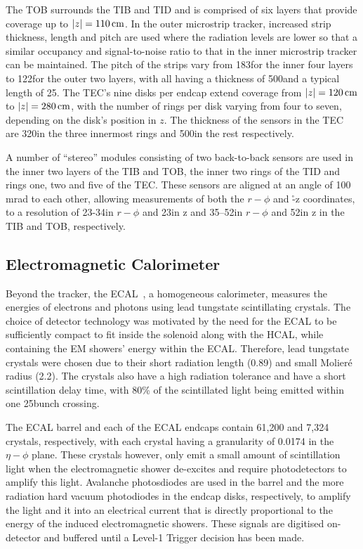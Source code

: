 The TOB surrounds the TIB and TID and is comprised of six layers that provide coverage up to $|z| = 110\,\text{cm}$.
In the outer microstrip tracker, increased strip thickness, length and pitch are used where the radiation levels are lower so that a similar occupancy and signal-to-noise ratio to that in the inner microstrip tracker can be maintained.
The pitch of the strips vary from 183\mum for the inner four layers to 122\mum for the outer two layers, with all having a thickness of 500\mum and a typical length of 25\cm. 
The TEC's nine disks per endcap extend coverage from $|z| = 120\,\text{cm}$ to $|z| = 280\,\text{cm}$, with the number of rings per disk varying from four to seven, depending on the disk's position in $z$.
The thickness of the sensors in the TEC are 320\mum in the three innermost rings and 500\mum in the rest respectively.

A number of ``stereo'' modules consisting of two back-to-back sensors are used in the inner two layers of the TIB and TOB, the inner two rings of the TID and rings one, two and five of the TEC.
These sensors are aligned at an angle of 100 mrad to each other, allowing measurements of both the $r-\phi$ and \r-z coordinates, to a resolution of 23-34\mum in $r-\phi$ and 23\mum in z and 35–52\mum in $r-\phi$ and 52\mum in z in the TIB and TOB, respectively.

\subsection{Electromagnetic Calorimeter}\label{subsec:ECAL}
Beyond the tracker, the ECAL~\cite{CMS:1997ysd,CMS:2002xia}, a homogeneous calorimeter, measures the energies of electrons and photons using lead tungstate scintillating crystals.
The choice of detector technology was motivated by the need for the ECAL to be sufficiently compact to fit inside the solenoid along with the HCAL, while containing the EM showers' energy within the ECAL.
Therefore, lead tungstate crystals were chosen due to their short radiation length (0.89\cm) and small Molier\'{e} radius (2.2\cm).
The crystals also have a high radiation tolerance and have a short scintillation delay time, with 80\% of the scintillated light being emitted within one 25\ns bunch crossing.

The ECAL barrel and each of the ECAL endcaps contain 61,200 and 7,324 crystals, respectively, with each crystal having a granularity of 0.0174 in the $\eta - \phi$ plane.
These crystals however, only emit a small amount of scintillation light when the electromagnetic shower de-excites and require photodetectors to amplify this light.
Avalanche photosdiodes are used in the barrel and the more radiation hard vacuum photodiodes in the endcap disks, respectively, to amplify the light and it into an electrical current that is directly proportional to the energy of the induced electromagnetic showers.
These signals are digitised on-detector and buffered until a Level-1 Trigger decision has been made.

